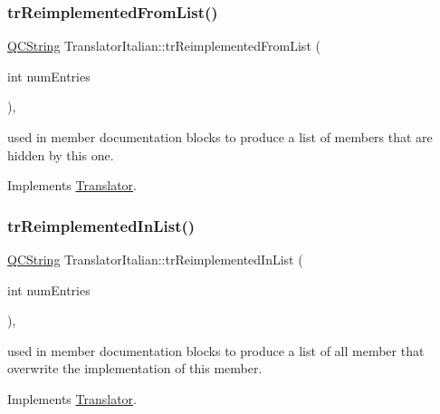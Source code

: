 \subsubsection{\texorpdfstring{trReimplementedFromList()}{trReimplementedFromList()}}
{\footnotesize\ttfamily \mbox{\hyperlink{class_q_c_string}{Q\+C\+String}} Translator\+Italian\+::tr\+Reimplemented\+From\+List (\begin{DoxyParamCaption}\item[{int}]{num\+Entries }\end{DoxyParamCaption})\hspace{0.3cm}{\ttfamily [inline]}, {\ttfamily [virtual]}}

used in member documentation blocks to produce a list of members that are hidden by this one. 

Implements \mbox{\hyperlink{class_translator}{Translator}}.

\mbox{\label{class_translator_italian_a3fc165634b3a5be4245b15a9ba37f6b1}} 
\subsubsection{\texorpdfstring{trReimplementedInList()}{trReimplementedInList()}}
{\footnotesize\ttfamily \mbox{\hyperlink{class_q_c_string}{Q\+C\+String}} Translator\+Italian\+::tr\+Reimplemented\+In\+List (\begin{DoxyParamCaption}\item[{int}]{num\+Entries }\end{DoxyParamCaption})\hspace{0.3cm}{\ttfamily [inline]}, {\ttfamily [virtual]}}

used in member documentation blocks to produce a list of all member that overwrite the implementation of this member. 

Implements \mbox{\hyperlink{class_translator}{Translator}}.

\mbox{\label{class_translator_italian_aaf7223507091afa2feb47872a7cf6d4d}} 
